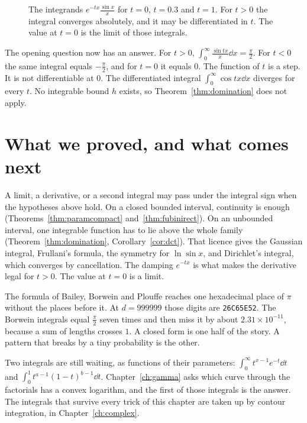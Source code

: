 \begin{figure}[ht]
\centering
{}
\caption{The integrands $e^{-tx}\frac{\sin x}x$ for $t=0$, $t=0.3$ and $t=1$. For $t>0$ the integral converges absolutely, and it may be
differentiated in $t$. The value at $t=0$ is the limit of those integrals.}
\label{fig:damped}
\end{figure}

The opening question now has an answer. For $t>0$, $\int_0^\infty\frac{\sin tx}x\dd x=\frac\pi2$. For $t<0$ the same integral equals $-\frac\pi2$,
and for $t=0$ it equals $0$. The function of $t$ is a step. It is not differentiable at $0$. The differentiated integral
$\int_0^\infty\cos tx\dd x$ diverges for every $t$. No integrable bound $h$ exists, so Theorem~\ref{thm:domination} does not apply.



\section{What we proved, and what comes next}

A limit, a derivative, or a second integral may pass under the integral sign when the hypotheses above hold. On a
closed bounded interval, continuity is enough (Theorems~\ref{thm:paramcompact} and~\ref{thm:fubinirect}). On an unbounded
interval, one integrable function has to lie above the whole family (Theorem~\ref{thm:domination},
Corollary~\ref{cor:dct}). That licence gives the Gaussian integral, Frullani's formula, the symmetry for $\ln\sin x$, and Dirichlet's integral, which converges by cancellation. The damping $e^{-tx}$ is what makes the derivative legal for $t>0$. The value at $t=0$ is a limit.

The formula of Bailey, Borwein and Plouffe reaches one hexadecimal place of $\pi$ without the places before it. At $d=999999$ those digits are \texttt{26C65E52}. The Borwein integrals equal $\frac\pi2$ seven times and then miss it by about $2.31\times10^{-11}$, because a sum of lengths crosses $1$. A closed form is one half of the story. A pattern that breaks by a tiny probability is the other.

Two integrals are still waiting, as functions of their parameters: $\int_0^\infty t^{x-1}e^{-t}\dd t$ and $\int_0^1 t^{a-1}(1-t)^{b-1}\dd t$. Chapter~\ref{ch:gamma} asks which curve through the factorials has a convex logarithm, and the first of those integrals is the answer. The integrals that survive every trick of this chapter are taken up by contour integration, in Chapter~\ref{ch:complex}.

